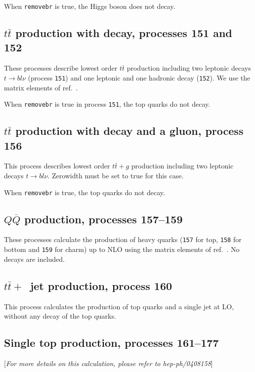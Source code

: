 \documentclass[12pt]{article}
\begin{document}
When {\tt removebr} is true, the Higgs boson does not decay.

\subsection{$t\bar{t}$ production with decay, processes 151 and 152}

These processes describe lowest order $t \bar{t}$ production 
including two leptonic decays $t \to b l \nu$ (process {\tt 151}) and 
one leptonic and one hadronic decay ({\tt 152}).
We use the matrix elements of ref.~\cite{Kleiss:1988xr}.


When {\tt removebr} is true in process {\tt 151},
the top quarks do not decay.

\subsection{$t\bar{t}$ production with decay and a gluon, process 156}
This process describes lowest order $t \bar{t}+g$ production 
including two leptonic decays $t \to b l \nu$. Zerowidth must be set to true for 
this case.

When {\tt removebr} is true, the top quarks do not decay.

\subsection{$Q\overline{Q}$ production, processes 157--159}
These processes calculate the production of heavy quarks
({\tt 157} for top, {\tt 158} for bottom and {\tt 159} for charm) up to NLO 
using the matrix elements of ref.~\cite{Nason:1987xz}. No decays
are included.

\subsection{$t{\bar t}+$~jet production, process 160}
This process calculates the production of top quarks and a single jet
at LO, without any decay of the top quarks.

\subsection{Single top production, processes 161--177}
\label{subsec:stop}

\begin{center}
[{\it For more details on this calculation, please refer to hep-ph/0408158}]
\end{center}
\end{document}

